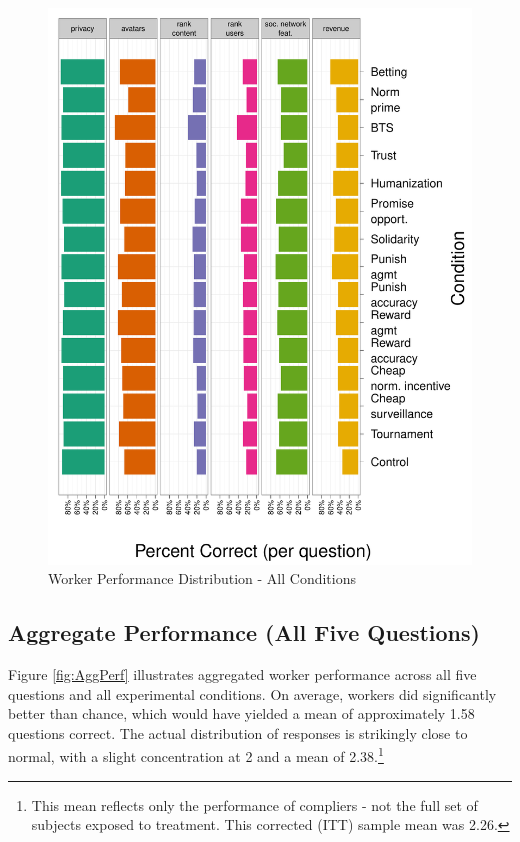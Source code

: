 \documentclass{chi2009}
\begin{document}
{\begin{figure} 
\centering 
\caption{Worker Performance Distribution - All Conditions \label{fig:per_q}}
\includegraphics[scale=.35]{../images/per_q}
\end{figure} 

\subsection{Aggregate Performance (All Five Questions)}

Figure \ref{fig:AggPerf} illustrates aggregated worker performance
across all five questions and all experimental conditions. On average,
workers did significantly better than chance, which would have yielded
a mean of approximately 1.58 questions correct.  The actual
distribution of responses is strikingly close to normal, with a slight
concentration at 2 and a mean of 2.38.\footnote{This mean reflects
  only the performance of compliers - not the full set of subjects
  exposed to treatment. This corrected (ITT) sample mean was 2.26.}

}
\end{document}
